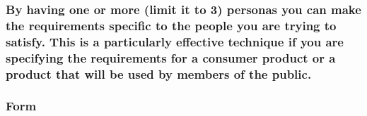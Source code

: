 \documentclass[
]{article}
\begin{document}
\hypertarget{by-having-one-or-more-limit-it-to-3-personas-you-can-make-the-requirements-specific-to-the-people-you-are-trying-to-satisfy.-this-is-a-particularly-effective-technique-if-you-are-specifying-the-requirements-for-a-consumer-product-or-a-product-that-will-be-used-by-members-of-the-public.}{%
\subsubsection{By having one or more (limit it to 3) personas you can
make the requirements specific to the people you are trying to satisfy.
This is a particularly effective technique if you are specifying the
requirements for a consumer product or a product that will be used by
members of the
public.}\label{by-having-one-or-more-limit-it-to-3-personas-you-can-make-the-requirements-specific-to-the-people-you-are-trying-to-satisfy.-this-is-a-particularly-effective-technique-if-you-are-specifying-the-requirements-for-a-consumer-product-or-a-product-that-will-be-used-by-members-of-the-public.}}

\hypertarget{form-6}{%
\subsubsection{Form}\label{form-6}}
\end{document}
